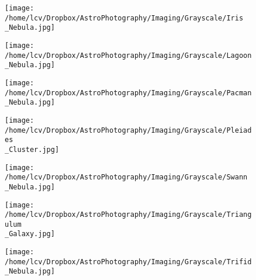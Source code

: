 \newpage
\begin{figure}[phbt]
	\texttt{[image: /home/lcv/Dropbox/AstroPhotography/Imaging/Grayscale/Iris\\\_Nebula.jpg]}


\end{figure}
\newpage
\begin{figure}[phbt]
	\texttt{[image: /home/lcv/Dropbox/AstroPhotography/Imaging/Grayscale/Lagoon\\\_Nebula.jpg]}


\end{figure}
\newpage
\begin{figure}[phbt]
	\texttt{[image: /home/lcv/Dropbox/AstroPhotography/Imaging/Grayscale/Pacman\\\_Nebula.jpg]}


\end{figure}
\newpage
\begin{figure}[phbt]
	\texttt{[image: /home/lcv/Dropbox/AstroPhotography/Imaging/Grayscale/Pleiades\\\_Cluster.jpg]}


\end{figure}
\newpage
\begin{figure}[phbt]
	\texttt{[image: /home/lcv/Dropbox/AstroPhotography/Imaging/Grayscale/Swann\\\_Nebula.jpg]}


\end{figure}
\newpage
\begin{figure}[phbt]
	\texttt{[image: /home/lcv/Dropbox/AstroPhotography/Imaging/Grayscale/Triangulum\\\_Galaxy.jpg]}


\end{figure}
\newpage
\begin{figure}[phbt]
	\texttt{[image: /home/lcv/Dropbox/AstroPhotography/Imaging/Grayscale/Trifid\\\_Nebula.jpg]}


\end{figure}
